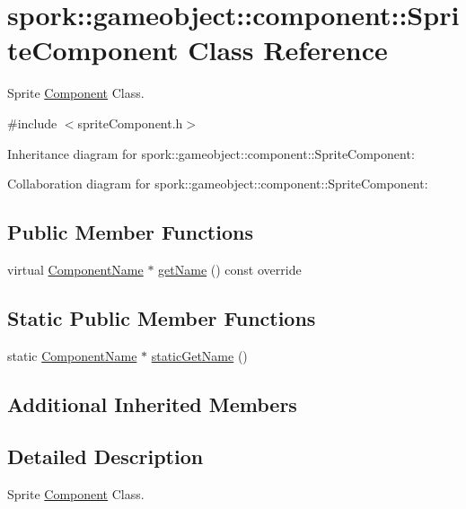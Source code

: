\hypertarget{classspork_1_1gameobject_1_1component_1_1_sprite_component}{}\section{spork\+:\+:gameobject\+:\+:component\+:\+:Sprite\+Component Class Reference}
\label{classspork_1_1gameobject_1_1component_1_1_sprite_component}


Sprite \hyperlink{classspork_1_1gameobject_1_1component_1_1_component}{Component} Class.  




{\ttfamily \#include $<$sprite\+Component.\+h$>$}



Inheritance diagram for spork\+:\+:gameobject\+:\+:component\+:\+:Sprite\+Component\+:


Collaboration diagram for spork\+:\+:gameobject\+:\+:component\+:\+:Sprite\+Component\+:
\subsection*{Public Member Functions}
\begin{DoxyCompactItemize}
\item 
virtual \hyperlink{structspork_1_1gameobject_1_1component_1_1_component_name}{Component\+Name} $\ast$ \hyperlink{classspork_1_1gameobject_1_1component_1_1_sprite_component_a3c3b5324ab563b6e759e07fd7e11b96c}{get\+Name} () const override
\end{DoxyCompactItemize}
\subsection*{Static Public Member Functions}
\begin{DoxyCompactItemize}
\item 
static \hyperlink{structspork_1_1gameobject_1_1component_1_1_component_name}{Component\+Name} $\ast$ \hyperlink{classspork_1_1gameobject_1_1component_1_1_sprite_component_a006e88cc9c1bc9e5640abec4bdb22824}{static\+Get\+Name} ()
\end{DoxyCompactItemize}
\subsection*{Additional Inherited Members}


\subsection{Detailed Description}
Sprite \hyperlink{classspork_1_1gameobject_1_1component_1_1_component}{Component} Class. 


